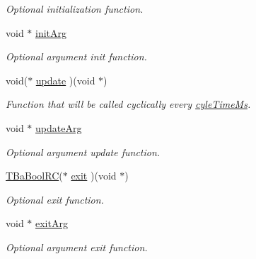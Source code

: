 \begin{DoxyCompactItemize}
\begin{DoxyCompactList}\small\item\em Optional initialization function. \end{DoxyCompactList}\item 
void $\ast$ \hyperlink{structTBaApiCtrlTaskOpts_ad3650f49b9a488c420c4c22da3ae1dda}{init\+Arg}\hypertarget{structTBaApiCtrlTaskOpts_ad3650f49b9a488c420c4c22da3ae1dda}{}\label{structTBaApiCtrlTaskOpts_ad3650f49b9a488c420c4c22da3ae1dda}

\begin{DoxyCompactList}\small\item\em Optional argument init function. \end{DoxyCompactList}\item 
void($\ast$ \hyperlink{structTBaApiCtrlTaskOpts_aeb48d712d7cc744807975ec51cdf9f37}{update} )(void $\ast$)\hypertarget{structTBaApiCtrlTaskOpts_aeb48d712d7cc744807975ec51cdf9f37}{}\label{structTBaApiCtrlTaskOpts_aeb48d712d7cc744807975ec51cdf9f37}

\begin{DoxyCompactList}\small\item\em Function that will be called cyclically every \hyperlink{structTBaApiCtrlTaskOpts_a4a2241999559f0924c70899e6c1e71f3}{cyle\+Time\+Ms}. \end{DoxyCompactList}\item 
void $\ast$ \hyperlink{structTBaApiCtrlTaskOpts_a596bfe867887a3d23e7888300708837c}{update\+Arg}\hypertarget{structTBaApiCtrlTaskOpts_a596bfe867887a3d23e7888300708837c}{}\label{structTBaApiCtrlTaskOpts_a596bfe867887a3d23e7888300708837c}

\begin{DoxyCompactList}\small\item\em Optional argument update function. \end{DoxyCompactList}\item 
\hyperlink{BaBool_8h_a84d5a0de4729ca4c89f2479c605dbf3d}{T\+Ba\+Bool\+RC}($\ast$ \hyperlink{structTBaApiCtrlTaskOpts_a987242de0c1c39f97ff157c918ad7746}{exit} )(void $\ast$)\hypertarget{structTBaApiCtrlTaskOpts_a987242de0c1c39f97ff157c918ad7746}{}\label{structTBaApiCtrlTaskOpts_a987242de0c1c39f97ff157c918ad7746}

\begin{DoxyCompactList}\small\item\em Optional exit function. \end{DoxyCompactList}\item 
void $\ast$ \hyperlink{structTBaApiCtrlTaskOpts_a4b4f0d49fe18ab1bebd856f2d07f65e3}{exit\+Arg}\hypertarget{structTBaApiCtrlTaskOpts_a4b4f0d49fe18ab1bebd856f2d07f65e3}{}\label{structTBaApiCtrlTaskOpts_a4b4f0d49fe18ab1bebd856f2d07f65e3}

\begin{DoxyCompactList}\small\item\em Optional argument exit function. \end{DoxyCompactList}\end{DoxyCompactItemize}



